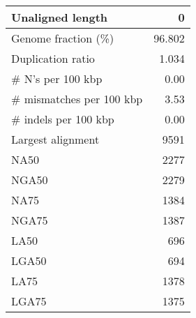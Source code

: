 \documentclass[12pt,a4paper]{article}
\begin{document}
\begin{table}[ht]
\begin{center}
\begin{tabular}{|l*{1}{|r}|}
Unaligned length & 0 \\ \hline
Genome fraction (\%) & 96.802 \\ \hline
Duplication ratio & 1.034 \\ \hline
\# N's per 100 kbp & 0.00 \\ \hline
\# mismatches per 100 kbp & 3.53 \\ \hline
\# indels per 100 kbp & 0.00 \\ \hline
Largest alignment & 9591 \\ \hline
NA50 & 2277 \\ \hline
NGA50 & 2279 \\ \hline
NA75 & 1384 \\ \hline
NGA75 & 1387 \\ \hline
LA50 & 696 \\ \hline
LGA50 & 694 \\ \hline
LA75 & 1378 \\ \hline
LGA75 & 1375 \\ \hline
\end{tabular}
\end{center}
\end{table}
\end{document}
